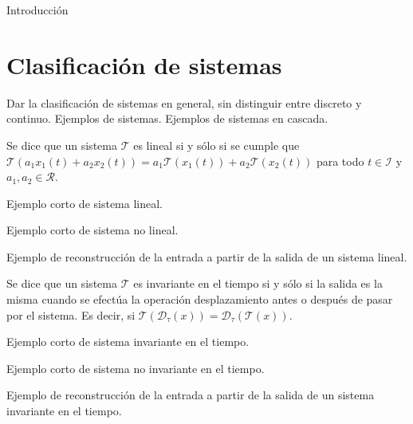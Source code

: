 
Introducción 

\section{Clasificación de sistemas}

Dar la clasificación de sistemas en general, sin distinguir entre discreto y continuo. Ejemplos de sistemas. Ejemplos de sistemas en cascada.

\begin{definition}[Linearidad]
    Se dice que un sistema $\mathcal{T}$ es lineal si y sólo si se cumple que $\mathcal{T}(a_1x_1(t) + a_2x_2(t)) = a_1\mathcal{T}(x_1(t)) + a_2\mathcal{T}(x_2(t))$ para todo $t \in \mathcal{I}$ y $a_1,a_2 \in \mathcal{R}$.    
\end{definition}

\begin{example}
    Ejemplo corto de sistema lineal.
\end{example}

\begin{example}
    Ejemplo corto de sistema no lineal.
\end{example}

\begin{example}
    Ejemplo de reconstrucción de la entrada a partir de la salida de un sistema lineal.
\end{example}

\begin{definition}
    Se dice que un sistema $\mathcal{T}$ es invariante en el tiempo si y sólo si la salida es la misma cuando se efectúa la operación desplazamiento antes o después de pasar por el sistema. Es decir, si $\mathcal{T}(\mathcal{D}_{\tau}(x)) = \mathcal{D}_{\tau}(\mathcal{T}(x))$.
\end{definition}

\begin{example}
    Ejemplo corto de sistema invariante en el tiempo.
\end{example}

\begin{example}
    Ejemplo corto de sistema no invariante en el tiempo.
\end{example}

\begin{example}
    Ejemplo de reconstrucción de la entrada a partir de la salida de un sistema invariante en el tiempo.
\end{example}


